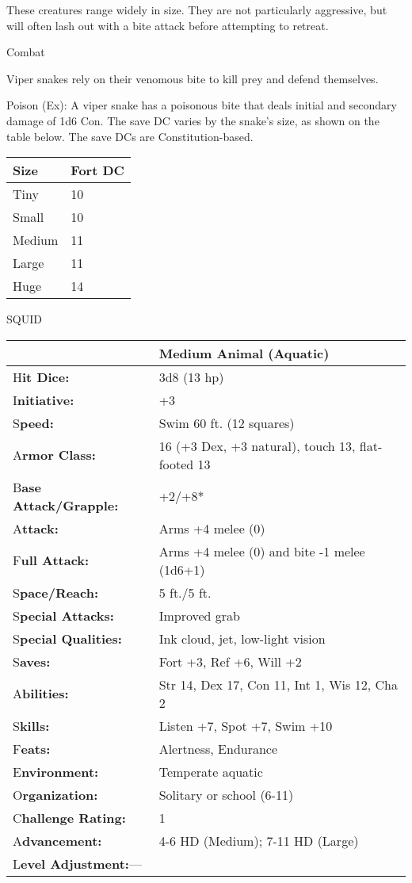 \documentclass{article}
\begin{document}
These creatures range widely in size. They are not particularly aggressive, but 
will often lash out with a bite attack before attempting to retreat.

Combat

Viper snakes rely on their venomous bite to kill prey and defend themselves.

Poison (Ex): A viper snake has a poisonous bite that deals initial and secondary 
damage of 1d6 Con. The save DC varies by the snake's size, as shown on the table 
below. The save DCs are Constitution-based.

\begin{tabular}{|>{\raggedright}p{32pt}|>{\raggedright}p{34pt}|}
\hline
S\textbf{ize} & F\textbf{ort DC}\tabularnewline
\hline
Tiny & 10\tabularnewline
\hline
Small & 10\tabularnewline
\hline
Medium & 11\tabularnewline
\hline
Large & 11\tabularnewline
\hline
Huge & 14\tabularnewline
\hline
\end{tabular}

\vspace{12pt}
SQUID

\begin{tabular}{|>{\raggedright}p{91pt}|>{\raggedright}p{193pt}|}
\hline
  & Medium Animal (Aquatic)\tabularnewline
\hline
H\textbf{it Dice:} & 3d8 (13 hp)\tabularnewline
\hline
I\textbf{nitiative:} & +3\tabularnewline
\hline
S\textbf{peed:} & Swim 60 ft. (12 squares)\tabularnewline
\hline
A\textbf{rmor Class:} & 16 (+3 Dex, +3 natural), touch 13, flat-footed 13\tabularnewline
\hline
B\textbf{ase Attack/Grapple:} & +2/+8*\tabularnewline
\hline
A\textbf{ttack:} & Arms +4 melee (0)\tabularnewline
\hline
F\textbf{ull Attack:} & Arms +4 melee (0) and bite -1 melee (1d6+1)\tabularnewline
\hline
S\textbf{pace/Reach:} & 5 ft./5 ft.\tabularnewline
\hline
S\textbf{pecial Attacks:} & Improved grab\tabularnewline
\hline
S\textbf{pecial Qualities:} & Ink cloud, jet, low-light vision\tabularnewline
\hline
S\textbf{aves:} & Fort +3, Ref +6, Will +2\tabularnewline
\hline
A\textbf{bilities:} & Str 14, Dex 17, Con 11, Int 1, Wis 12, Cha 2\tabularnewline
\hline
S\textbf{kills:} & Listen +7, Spot +7, Swim +10\tabularnewline
\hline
F\textbf{eats:} & Alertness, Endurance\tabularnewline
\hline
E\textbf{nvironment:} & Temperate aquatic\tabularnewline
\hline
O\textbf{rganization:} & Solitary or school (6-11)\tabularnewline
\hline
C\textbf{hallenge Rating:} & 1\tabularnewline
\hline
A\textbf{dvancement:} & 4-6 HD (Medium); 7-11 HD (Large)\tabularnewline
\hline
L\textbf{evel Adjustment:}--- & \tabularnewline
\hline
\end{tabular}
\end{document}
